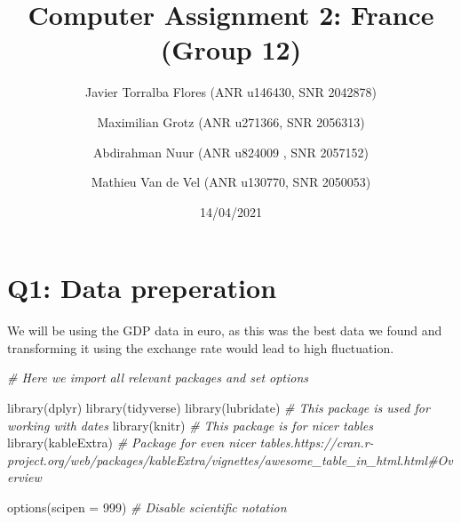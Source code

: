 \documentclass[
]{article}
\title{Computer Assignment 2: France (Group 12)}
\author{Javier Torralba Flores (ANR u146430, SNR
2042878) \and Maximilian Grotz (ANR u271366, SNR
2056313) \and Abdirahman Nuur (ANR u824009 , SNR 2057152) \and Mathieu
Van de Vel (ANR u130770, SNR 2050053)}
\date{14/04/2021}
\newenvironment{Shaded}{\begin{snugshade}}{\end{snugshade}}
\newcommand{\AttributeTok}[1]{\textcolor[rgb]{0.77,0.63,0.00}{#1}}
\newcommand{\CommentTok}[1]{\textcolor[rgb]{0.56,0.35,0.01}{\textit{#1}}}
\newcommand{\DecValTok}[1]{\textcolor[rgb]{0.00,0.00,0.81}{#1}}
\newcommand{\FunctionTok}[1]{\textcolor[rgb]{0.00,0.00,0.00}{#1}}
\newcommand{\NormalTok}[1]{#1}
\begin{document}
\maketitle

\hypertarget{q1-data-preperation}{%
\section{Q1: Data preperation}\label{q1-data-preperation}}

We will be using the GDP data in euro, as this was the best data we
found and transforming it using the exchange rate would lead to high
fluctuation.

\begin{Shaded}
\begin{Highlighting}[]
\CommentTok{\# Here we import all relevant packages and set options}

\FunctionTok{library}\NormalTok{(dplyr)}
\FunctionTok{library}\NormalTok{(tidyverse)}
\FunctionTok{library}\NormalTok{(lubridate) }\CommentTok{\# This package is used for working with dates}
\FunctionTok{library}\NormalTok{(knitr) }\CommentTok{\# This package is for nicer tables}
\FunctionTok{library}\NormalTok{(kableExtra) }\CommentTok{\# Package for even nicer tables.https://cran.r{-}project.org/web/packages/kableExtra/vignettes/awesome\_table\_in\_html.html\#Overview}

\FunctionTok{options}\NormalTok{(}\AttributeTok{scipen =} \DecValTok{999}\NormalTok{) }\CommentTok{\# Disable scientific notation}
\end{Highlighting}
\end{Shaded}
\end{document}
